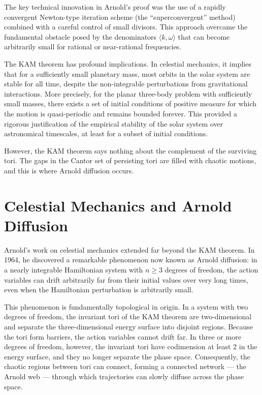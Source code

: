 The key technical innovation in Arnold's proof was the use of a rapidly convergent Newton-type iteration scheme (the ``superconvergent'' method) combined with a careful control of small divisors. This approach overcame the fundamental obstacle posed by the denominators \(\langle k,\omega\rangle\) that can become arbitrarily small for rational or near-rational frequencies.

The KAM theorem has profound implications. In celestial mechanics, it implies that for a sufficiently small planetary mass, most orbits in the solar system are stable for all time, despite the non-integrable perturbations from gravitational interactions. More precisely, for the planar three-body problem with sufficiently small masses, there exists a set of initial conditions of positive measure for which the motion is quasi-periodic and remains bounded forever. This provided a rigorous justification of the empirical stability of the solar system over astronomical timescales, at least for a subset of initial conditions.

However, the KAM theorem says nothing about the complement of the surviving tori. The gaps in the Cantor set of persisting tori are filled with chaotic motions, and this is where Arnold diffusion occurs.

\section{Celestial Mechanics and Arnold Diffusion}

Arnold's work on celestial mechanics extended far beyond the KAM theorem. In 1964, he discovered a remarkable phenomenon now known as Arnold diffusion: in a nearly integrable Hamiltonian system with \(n \geq 3\) degrees of freedom, the action variables can drift arbitrarily far from their initial values over very long times, even when the Hamiltonian perturbation is arbitrarily small.

This phenomenon is fundamentally topological in origin. In a system with two degrees of freedom, the invariant tori of the KAM theorem are two-dimensional and separate the three-dimensional energy surface into disjoint regions. Because the tori form barriers, the action variables cannot drift far. In three or more degrees of freedom, however, the invariant tori have codimension at least 2 in the energy surface, and they no longer separate the phase space. Consequently, the chaotic regions between tori can connect, forming a connected network --- the Arnold web --- through which trajectories can slowly diffuse across the phase space.

